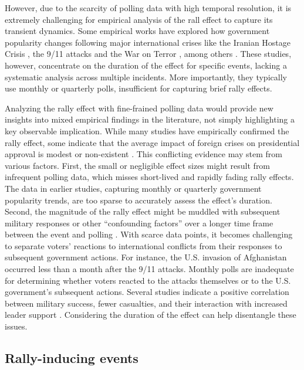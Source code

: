 \documentclass[letterpaper,12pt]{scrartcl}
\begin{document}
However, due to the scarcity of polling data with high temporal resolution, it is extremely challenging for empirical analysis of the rall effect to capture its transient dynamics.  Some empirical works have explored how government popularity changes following major international crises like the Iranian Hostage Crisis \citep{sigelman1981,callaghan1993}, the 9/11 attacks and the War on Terror \citep{Schubert2002PolitPsychol,hetherington2003,Eichenberg2006JCR,Kam2008POQ}, among others \citep{Parker1995POQ,edwards1997,jentleson1998,Lai2005ISQ}. These studies, however, concentrate on the duration of the effect for specific events, lacking a systematic analysis across multiple incidents. More importantly, they typically use monthly or quarterly polls, insufficient for capturing brief rally effects.

Analyzing the rally effect with fine-frained polling data would provide new insights into mixed empirical findings in the literature, not simply highlighting a key observable implication. While many studies have empirically confirmed the rally effect, some indicate that the average impact of foreign crises on presidential approval is modest or non-existent \citep{Lian1993JCR,Oneal1995PolitBehav,Baker2001JCR}. This conflicting evidence may stem from various factors. First, the small or negligible effect sizes might result from infrequent polling data, which misses short-lived and rapidly fading rally effects. The data in earlier studies, capturing monthly or quarterly government popularity trends, are too sparse to accurately assess the effect's duration. Second, the magnitude of the rally effect might be muddled with subsequent military responses or other ``confounding factors'' over a longer time frame between the event and polling \citep{James1998PRQ}. With scarce data points, it becomes challenging to separate voters' reactions to international conflicts from their responses to subsequent government actions. For instance, the U.S. invasion of Afghanistan occurred less than a month after the 9/11 attacks. Monthly polls are inadequate for determining whether voters reacted to the attacks themselves or to the U.S. government's subsequent actions. Several studies indicate a positive correlation between military success, fewer casualties, and their interaction with increased leader support \citep{eichenberg2005victory,gartner2008,kuijpers2019,umitforthcoming}. Considering the duration of the effect can help disentangle these issues.

\subsection*{Rally-inducing events}
\end{document}
